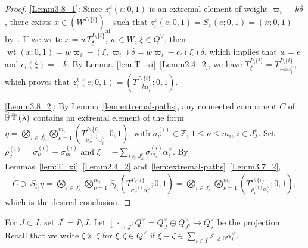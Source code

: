 \documentclass[ALCO,ThmDefs,Unicode,epreuves]{cedram}
\newcommand{\BZ}{\mathbb{Z}}
\newcommand{\si}{\frac{\infty}{2}}
\DeclareMathOperator{\af}{af}
\DeclareMathOperator{\wt}{wt}
\begin{document}
\begin{proof}
\ref{Lemm3.8_1}: 
Since 
$z_i^k(e;0,1)$
is an extremal element of weight $\varpi_i + k\delta$, 
there exists 
$x \in (W^{I \setminus \{ i \}})_{\af}$
such that 
$z_i^k(e;0,1) = S_x (e;0,1) = (x;0,1)$ 
by~\cite[Proposition~5.4~(i)]{K02}. 
If we write 
$x = wT^{I \setminus \{ i \}}_{\xi}$, 
$w \in W$, 
$\xi \in Q^{\vee}$, 
then 
$\wt (x;0,1) 
= w\varpi_i - (\xi,\varpi_i)\delta = w \varpi_i - c_i(\xi) \delta$, 
which implies that 
$w = e$
and 
$c_i(\xi) = -k$. 
By Lemma~\ref{lem:T_xi}~\ref{Lemm2.4_2}, 
we have 
$T^{I \setminus \{ i \}}_{\xi} = T^{I \setminus \{ i \}}_{-k\alpha_i^{\vee}}$, 
which proves that 
$z_i^k(e;0,1) = \left( T^{I \setminus \{ i \}}_{-k\alpha_i^{\vee}} ; 0,1 \right)$. 
 
\ref{Lemm3.8_2}: 
By Lemma~\ref{lem:extremal-paths}, 
any connected component $C$ of 
$\Breve{\mathbb{B}}^{\si}(\lambda)$
contains an extremal element of the form 
$\eta = \bigotimes_{i \in J_{\lambda}^c} 
\bigotimes_{\nu=1}^{m_i} \left(T^{I \setminus \{ i \}}_{\sigma^{(i)}_{\nu} \alpha_i^{\vee}} ;0,1 \right)$, 
with 
$\sigma^{(i)}_{\nu} \in \BZ$, $1 \leq \nu \leq m_i$, $i \in J_{\lambda}^c$. 
Set 
$\rho^{(i)}_{\nu} = \sigma^{(i)}_{\nu} - \sigma^{(i)}_{m_i}$ 
and 
$\xi = -\sum_{i \in J_{\lambda}^c} \sigma^{(i)}_{m_i} \alpha_i^{\vee}$. 
By Lemmas~\ref{lem:T_xi}~\ref{Lemm2.4_2} and~\ref{lem:extremal-paths}~\ref{Lemm3.7_2}, 
\begin{align}
C \ni \, 
S_{t_{\xi}} \eta 
= 
\bigotimes_{i \in J_{\lambda}^c} \bigotimes_{\nu = 1}^{m_i} 
S_{t_{\xi}} \left(T^{I \setminus \{ i \}}_{\sigma^{(i)}_{\nu} \alpha_i^{\vee}} ;0,1 \right)
=
\bigotimes_{i \in J_{\lambda}^c} \bigotimes_{\nu = 1}^{m_i} 
\left( T^{I \setminus \{ i \}}_{\rho^{(i)}_{\nu} \alpha_i^{\vee}} ; 0,1 \right) , 
\end{align}
which is the desired conclusion.
\end{proof}

For 
$J \subset I$, 
set
$J^c = I \setminus J$. 
Let 
$[ \, \cdot \, ]_J : Q^{\vee} = Q^{\vee}_J \oplus Q^{\vee}_{J^c} \rightarrow Q_J^{\vee}$
be the projection. 
Recall that we write
$\xi \succeq \zeta$
for 
$\xi , \zeta \in Q^{\vee}$ 
if 
$\xi - \zeta \in \sum_{i \in I} \BZ_{\geq 0} \alpha_i^{\vee}$.
\end{document}
